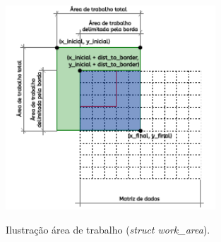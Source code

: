 \begin{figure}
  \centering
  \caption{Ilustração área de trabalho (\textit{struct work\_area}).}
  \includegraphics[width=0.7\textwidth]{figs/work_area.pdf}
  \label{fig:workarea}
\end{figure}

